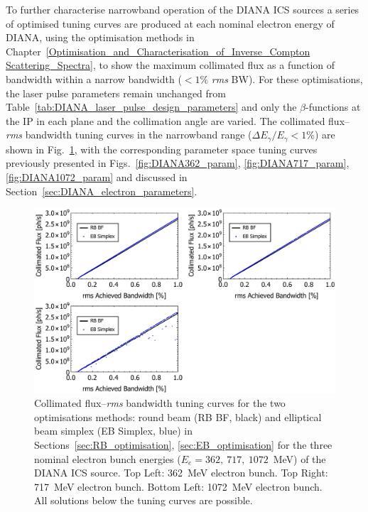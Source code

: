 \documentclass[../main.tex]{subfiles}
\begin{document}
To further characterise narrowband operation of the DIANA ICS sources a series of optimised tuning curves are produced at each nominal electron energy of DIANA, using the optimisation methods in Chapter~\ref{Optimisation_and_Characterisation_of_Inverse_Compton Scattering_Spectra}, to show the maximum collimated flux as a function of bandwidth within a narrow bandwidth ($<1$\% \textit{rms} BW). For these optimisations, the laser pulse parameters remain unchanged from Table~\ref{tab:DIANA_laser_pulse_design_parameters} and only the $\beta$-functions at the IP in each plane and the collimation angle are varied. The collimated flux--\textit{rms} bandwidth tuning curves in the narrowband range ($\Delta E_{\gamma}/E_{\gamma} < 1$\%) are shown in Fig.~\ref{fig:DIANA_FBW}, with the corresponding parameter space tuning curves previously presented in Figs.~\ref{fig:DIANA362_param}, \ref{fig:DIANA717_param}, \ref{fig:DIANA1072_param} and discussed in Section~\ref{sec:DIANA_electron_parameters}.  
\begin{figure}[!h]
\centering
\includegraphics[width=\textwidth]{Figures/DIANA_Inverse_Compton_Source_Design/DIANAFBW.pdf}
\caption{Collimated flux--\textit{rms} bandwidth tuning curves for the two optimisations methods: round beam (RB BF, black) and elliptical beam simplex (EB Simplex, blue) in Sections~\ref{sec:RB_optimisation}, \ref{sec:EB_optimisation} for the three nominal electron bunch energies ($E_{e}=362,~717,~1072$~\si{\mega\electronvolt}) of the DIANA ICS source. Top Left: 362~\si{\mega\electronvolt} electron bunch. Top Right: 717~\si{\mega\electronvolt} electron bunch. Bottom Left: 1072~\si{\mega\electronvolt} electron bunch. All solutions below the tuning curves are possible.}
\label{fig:DIANA_FBW}
\end{figure}
\end{document}
